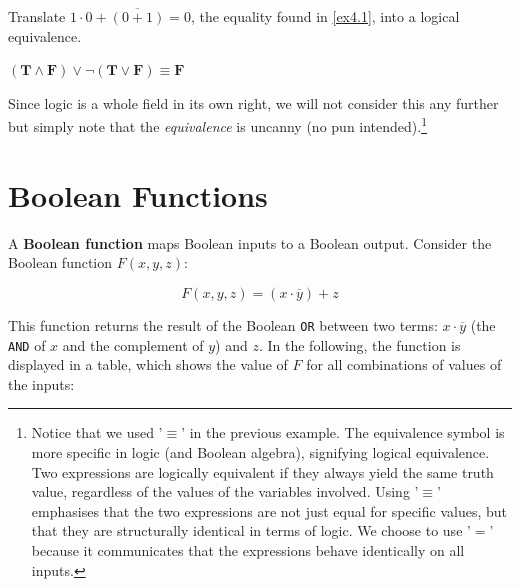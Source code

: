 \begin{example}
    Translate $1 \cdot 0+\overline{(0+1)}=0$, the equality found in \autoref{ex4.1}, into a logical equivalence.

    \begin{solution}
        $(\mathbf{T} \wedge \mathbf{F}) \vee \neg(\mathbf{T} \vee \mathbf{F}) \equiv \mathbf{F}$
    \end{solution}
    
\end{example}

Since logic is a whole field in its own right, we will not consider this any further but simply note that the \textit{equivalence} is uncanny (no pun intended).\footnote{Notice that we used '$\equiv$' in the previous example. The equivalence symbol is more specific in logic (and Boolean algebra), signifying logical equivalence. Two expressions are logically equivalent if they always yield the same truth value, regardless of the values of the variables involved. Using '$\equiv$' emphasises that the two expressions are not just equal for specific values, but that they are structurally identical in terms of logic. We choose to use '$=$' because it communicates that the expressions behave identically on all inputs.}

\section{Boolean Functions}

A \textbf{Boolean function} maps Boolean inputs to a Boolean output. Consider the Boolean function $F(x, y, z)$:

\[
F(x, y, z) = (x \cdot \overline{y}) + z
\]

This function returns the result of the Boolean \texttt{OR} between two terms: $x \cdot \overline{y}$ (the \texttt{AND} of $x$ and the complement of $y$) and $z$. In the following, the function is displayed in a table, which shows the value of $F$ for all combinations of values of the inputs:

